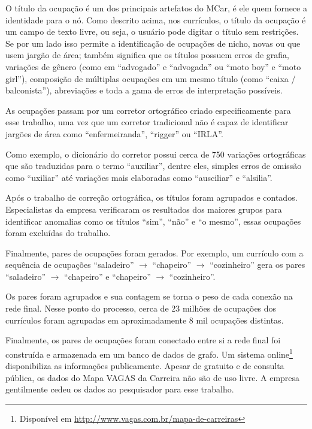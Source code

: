 \documentclass[
  article,
  11pt,
  a4paper,
  english,
  brazil,
  sumario=tradicional]{abntex2}
\begin{document}
O título da ocupação é um dos principais artefatos do MCar, é ele quem fornece a identidade para o nó. Como descrito acima, nos currículos, o título da ocupação é um campo de texto livre, ou seja, o usuário pode digitar o título sem restrições. Se por um lado isso permite a identificação de ocupações de nicho, novas ou que usem jargão de área; também significa que os títulos possuem erros de grafia, variações de gênero (como em \enquote{advogado} e \enquote{advogada} ou \enquote{moto boy} e \enquote{moto girl}), composição de múltiplas ocupações em um mesmo título (como \enquote{caixa / balconista}), abreviações e toda a gama de erros de interpretação possíveis.

As ocupações passam por um corretor ortográfico criado especificamente para esse trabalho, uma vez que um corretor tradicional não é capaz de identificar jargões de área como \enquote{enfermeiranda}, \enquote{rigger} ou \enquote{IRLA}.

Como exemplo, o dicionário do corretor possui cerca de 750 variações ortográficas que são traduzidas para o termo \enquote{auxiliar}, dentre eles, simples erros de omissão como \enquote{uxiliar} até variações mais elaboradas como \enquote{ausciliar} e \enquote{alsilia}.

Após o trabalho de correção ortográfica, os títulos foram agrupados e contados. Especialistas da empresa verificaram os resultados dos maiores grupos para identificar anomalias como os títulos \enquote{sim}, \enquote{não} e \enquote{o mesmo}, essas ocupações foram excluídas do trabalho.

Finalmente, pares de ocupações foram gerados. Por exemplo, um currículo com a sequência de ocupações \enquote{saladeiro} $\to$ \enquote{chapeiro} $\to$ \enquote{cozinheiro} gera os pares \enquote{saladeiro} $\to$ \enquote{chapeiro} e \enquote{chapeiro} $\to$ \enquote{cozinheiro}.

Os pares foram agrupados e sua contagem se torna o peso de cada conexão na rede final. Nesse ponto do processo, cerca de 23 milhões de ocupações dos currículos foram agrupadas em aproximadamente 8 mil ocupações distintas.

Finalmente, os pares de ocupações foram conectado entre si a rede final foi construída e armazenada em um banco de dados de grafo. Um sistema online\footnote{Disponível em \url{http://www.vagas.com.br/mapa-de-carreiras}} disponibiliza as informações publicamente. Apesar de gratuito e de consulta pública, os dados do Mapa VAGAS da Carreira não são de uso livre. A empresa gentilmente cedeu os dados ao pesquisador para esse trabalho.
\end{document}
